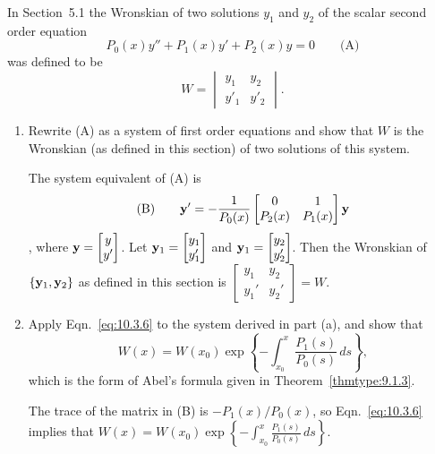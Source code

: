 \documentclass{ximera}
\begin{document}
\begin{problem}\label{exer:10.3.2}
In Section~5.1 the Wronskian of two
solutions $y_1$ and $y_2$ of the scalar second order equation
$$
P_0(x)y''+P_1(x)y'+P_2(x)y=0
\quad\quad\text{(A)}
$$
was defined to be
$$
W=\begin{vmatrix} y_1&y_2 \\ y'_1&y'_2\end{vmatrix}.
$$
\begin{enumerate}
\item %
Rewrite  (A)   as a system of first order equations and show
that $W$ is
the Wronskian (as defined in this section) of two solutions of this system.

\begin{solution}
    The system equivalent of (A) is $$\text{(B)}\quad\quad {\bf
y}'=-\frac{1}{P_0(x)}\begin{bmatrix}0&1\\P_2(x)&P_1(x)\end{bmatrix}{\bf y}$$, where
${\bf y}=\begin{bmatrix}y\\y'\end{bmatrix}$. Let ${\bf y}_1=\begin{bmatrix}y_1\\y_1'\end{bmatrix}$ and
 ${\bf y}_1=\begin{bmatrix}y_2\\y_2'\end{bmatrix}$. Then the Wronskian of $\{{\bf
y}_1,{\bf y}_2\}$ as defined in this section is
$\begin{bmatrix}y_1&y_2\\y_1'&y_2'\end{bmatrix}=W$.
\end{solution}

\item %
Apply Eqn.~\ref{eq:10.3.6} to the system  derived in part (a), and
show that
$$
W(x)=W(x_0)\exp\left\{-\int^x_{x_0}\frac{P_1(s)}{ P_0(s)}\,
ds\right\},
$$
which is the form of Abel's formula given in
Theorem~\ref{thmtype:9.1.3}.

\begin{solution}
    The trace of the matrix in (B) is $-P_1(x)/P_0(x)$, so Eqn.~\ref{eq:10.3.6} implies
that
$W(x)=W(x_0)\exp\left\{-\int^x_{x_0}\frac{P_1(s)}{P_0(s)}\,
ds\right\}$.
\end{solution}

\end{enumerate}
\end{problem}
\end{document}
